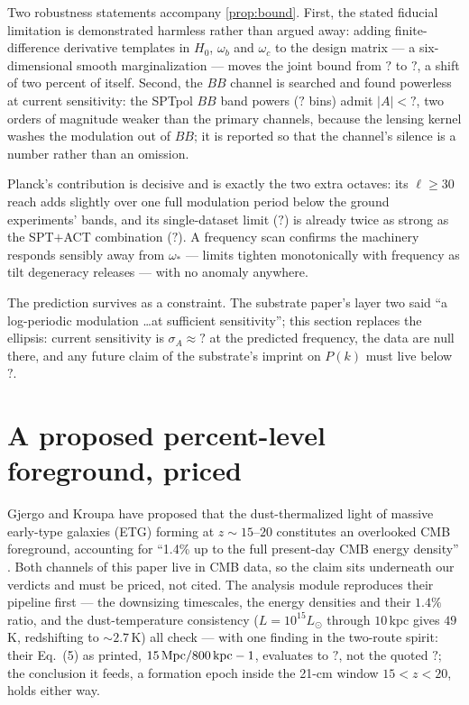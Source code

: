 \documentclass[11pt,a4paper]{article}
\newcommand{\CFSigAmpTri}{?}\newcommand{\CFULACT}{?}
\newcommand{\CFULDuo}{?}\newcommand{\CFULHarmTwo}{?}
\newcommand{\CFULPlanck}{?}\newcommand{\CFULSPT}{?}\newcommand{\CFULTri}{?}
\newcommand{\CFULTriRobust}{?}\newcommand{\CFULBB}{?}
\newcommand{\CFNBinsBB}{?}\newcommand{\CFBKChiralSN}{?}
\newcommand{\CFGKZfPrinted}{?}\newcommand{\CFGKZfComputed}{?}
\theoremstyle{plain}
\theoremstyle{definition}
\begin{document}
Two robustness statements accompany \cref{prop:bound}. First, the
stated fiducial limitation is demonstrated harmless rather than argued
away: adding finite-difference derivative templates in $H_{0}$,
$\omega_{b}$ and $\omega_{c}$ to the design matrix --- a
six-dimensional smooth marginalization --- moves the joint bound from
$\CFULTri$ to $\CFULTriRobust$, a shift of two percent of itself.
Second, the $BB$ channel is searched and found powerless at current
sensitivity: the SPTpol $BB$ band powers ($\CFNBinsBB$ bins) admit
$|A|<\CFULBB$, two orders of magnitude weaker than the primary
channels, because the lensing kernel washes the modulation out of $BB$;
it is reported so that the channel's silence is a number rather than an
omission.

Planck's contribution is decisive and is exactly the two extra octaves:
its $\ell\ge30$ reach adds slightly over one full modulation period
below the ground experiments' bands, and its single-dataset limit
($\CFULPlanck$) is already twice as strong as the SPT$+$ACT
combination ($\CFULDuo$). A frequency scan confirms the machinery
responds sensibly away from $\omega_{*}$ --- limits tighten
monotonically with frequency as tilt degeneracy releases --- with no
anomaly anywhere.

The prediction survives as a constraint. The substrate paper's layer
two said ``a log-periodic modulation \ldots at sufficient sensitivity'';
this section replaces the ellipsis: current sensitivity is
$\sigma_{A}\approx\CFSigAmpTri$ at the predicted frequency, the data
are null there, and any future claim of the substrate's imprint on
$P(k)$ must live below $\CFULTri$.

\section{A proposed percent-level foreground, priced}
\label{sec:etg}

Gjergo and Kroupa have proposed that the dust-thermalized light of massive early-type galaxies (ETG) forming at
$z\sim15$--$20$ constitutes an overlooked CMB foreground, accounting
for ``1.4\% up to the full present-day CMB energy density''
\cite{GjergoKroupa}. Both channels of this paper live in CMB data, so
the claim sits underneath our verdicts and must be priced, not cited.
The analysis module reproduces their pipeline first --- the downsizing
timescales, the energy densities and their $1.4\%$ ratio, and the
dust-temperature consistency ($L=10^{15}L_{\odot}$ through
$10\,$kpc gives $49\,$K, redshifting to $\sim2.7\,$K) all check ---
with one finding in the two-route spirit: their Eq.~(5) as printed,
$15\,{\rm Mpc}/800\,{\rm kpc}-1$, evaluates to $\CFGKZfComputed$,
not the quoted $\CFGKZfPrinted$; the conclusion it feeds, a formation
epoch inside the 21-cm window $15<z<20$, holds either way.
\end{document}
